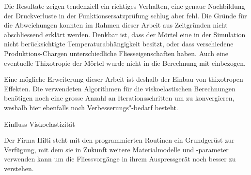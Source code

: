 Die Resultate zeigen tendenziell ein richtiges Verhalten, eine genaue Nachbildung der Druckverluste in der Funktionsersatzprüfung schlug aber fehl. Die Gründe für die Abweichungen konnten im Rahmen dieser Arbeit aus Zeitgründen nicht abschliessend erklärt werden. Denkbar ist, dass der Mörtel eine in der Simulation nicht berücksichtigte Temperaturabhängigkeit besitzt, oder dass verschiedene Produktions-Chargen unterschiedliche Fliesseigenschaften haben. Auch eine eventuelle Thixotropie der Mörtel wurde nicht in die Berechnung mit einbezogen.

Eine mögliche Erweiterung dieser Arbeit ist deshalb der Einbau von thixotropen Effekten.
Die verwendeten Algorithmen für die viskoelastischen Berechnungen benötigen noch eine grosse Anzahl an Iterationsschritten um zu konvergieren, weshalb hier ebenfalls noch Verbesserungs"-bedarf besteht.

\begin{todocontent}
    \1 Einfluss Viskoelastizität
\end{todocontent}

Der Firma Hilti steht mit den programmierten Routinen ein Grundgerüst zur Verfügung, mit dem sie in Zukunft weitere Materialmodelle und -parameter verwenden kann um die Fliessvorgänge in ihrem Auspressgerät noch besser zu verstehen.

%
